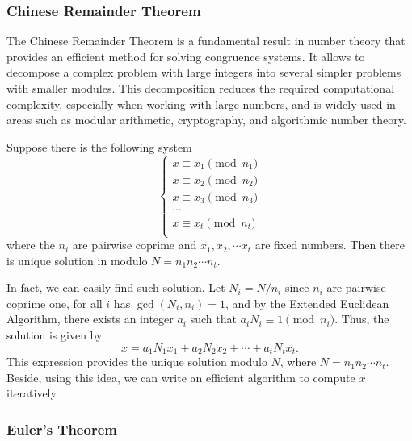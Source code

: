 \documentclass[../lecture-notes.tex]{subfiles}
\begin{document}
\subsubsection{Chinese Remainder Theorem}
The Chinese Remainder Theorem is a fundamental result in number theory
that provides an efficient method for solving congruence systems. It allows to
decompose a complex problem with large integers into several simpler 
problems with smaller modules. This decomposition reduces the required computational 
complexity, especially when working with large numbers, and is widely used 
in areas such as modular arithmetic, cryptography, and algorithmic number theory. 

\begin{theorem}  \label{th:chinese_remainder_theorem}
    Suppose there is the following system
    \begin{equation*}    
        \begin{cases}
            x \equiv x_1 \pmod{n_1} \\
            x \equiv x_2 \pmod{n_2} \\
            x \equiv x_3 \pmod{n_3} \\
            \cdots \\
            x \equiv x_t \pmod{n_t} \\
        \end{cases}
    \end{equation*}
    where the $n_i$ are pairwise coprime and $x_1, x_2, \cdots x_t$ are fixed numbers. 
    Then there is unique solution in modulo $N = n_1n_2 \cdots n_t$.
\end{theorem}

In fact, we can easily find such solution. Let $N_i = N/n_i$ since $n_i$ are pairwise coprime one, 
for all $i$ has $\gcd(N_i, n_i) = 1$, and by the Extended Euclidean Algorithm, there exists an integer
$a_i$ such that $a_iN_i \equiv 1 \pmod{n_i}$. Thus, the solution is given by 
\begin{equation*}
    x = a_1N_1x_1 + a_2N_2x_2 + \cdots + a_tN_tx_t .
\end{equation*}
This expression provides the unique solution modulo \( N \), where \( N = n_1 n_2 \cdots n_t \). 
Beside, using this idea, we can write an efficient algorithm to compute \( x \) iteratively.

\subsubsection{Euler's Theorem}
\end{document}
